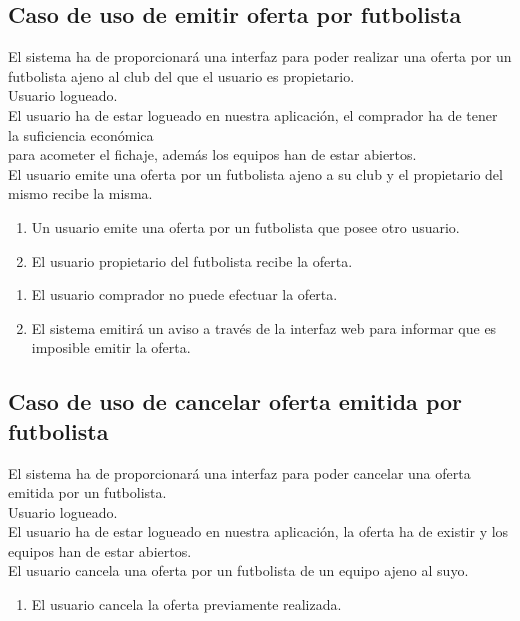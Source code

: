 \subsection*{Caso de uso de emitir oferta por futbolista}
 El sistema ha de proporcionará una interfaz para poder
realizar una oferta por un futbolista ajeno al club del que el usuario es
propietario.\\
 Usuario logueado. \\
 El usuario ha de estar logueado en nuestra aplicación,
el comprador ha de tener la suficiencia económica \\
para acometer el fichaje, además los equipos han de estar abiertos. \\
 El usuario emite una oferta por un futbolista ajeno a
su club y el propietario del mismo recibe la misma.  \\
\begin{enumerate}
\item Un usuario emite una oferta por un futbolista que posee otro usuario.
\item El usuario propietario del futbolista recibe la oferta.
\end{enumerate}
\begin{enumerate}
\item El usuario comprador no puede efectuar la oferta.
\item El sistema emitirá un aviso a través de la interfaz web para informar que
  es imposible emitir la oferta.
\end{enumerate}

\subsection*{Caso de uso de cancelar oferta emitida por futbolista}
 El sistema ha de proporcionará una interfaz para poder
cancelar una oferta emitida por un futbolista.\\
 Usuario logueado. \\
 El usuario ha de estar logueado en nuestra aplicación,
la oferta ha de existir y los equipos han de estar
abiertos. \\
 El usuario cancela una oferta por un futbolista de un
equipo ajeno al suyo.  
\\
\begin{enumerate}
\item El usuario cancela la oferta previamente realizada.
\end{enumerate}

